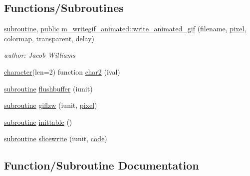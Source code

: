 \subsection*{Functions/\+Subroutines}
\begin{DoxyCompactItemize}
\item 
\hyperlink{M__stopwatch_83_8txt_acfbcff50169d691ff02d4a123ed70482}{subroutine}, \hyperlink{M__stopwatch_83_8txt_a2f74811300c361e53b430611a7d1769f}{public} \hyperlink{namespacem__writegif__animated_a3da6a5c71a9d9e1f49aa075adc6629bd}{m\+\_\+writegif\+\_\+animated\+::write\+\_\+animated\+\_\+gif} (filename, \hyperlink{shell_8f90_a5c599e945a5e0c9c8954969ea48587cf}{pixel}, colormap, transparent, delay)
\begin{DoxyCompactList}\small\item\em author\+: Jacob Williams \end{DoxyCompactList}\item 
\hyperlink{option__stopwatch_83_8txt_abd4b21fbbd175834027b5224bfe97e66}{character}(len=2) function \hyperlink{M__writegif__animated_8f90_a795066c06f318c8d4ba41430b6826567}{char2} (ival)
\item 
\hyperlink{M__stopwatch_83_8txt_acfbcff50169d691ff02d4a123ed70482}{subroutine} \hyperlink{M__writegif__animated_8f90_a83cb0569b0e010d8ad27afd1b4cd945e}{flushbuffer} (iunit)
\item 
\hyperlink{M__stopwatch_83_8txt_acfbcff50169d691ff02d4a123ed70482}{subroutine} \hyperlink{M__writegif__animated_8f90_aa30b256c6cb90f13a18e32768d35696b}{giflzw} (iunit, \hyperlink{shell_8f90_a5c599e945a5e0c9c8954969ea48587cf}{pixel})
\item 
\hyperlink{M__stopwatch_83_8txt_acfbcff50169d691ff02d4a123ed70482}{subroutine} \hyperlink{M__writegif__animated_8f90_acd7274fbac8690a12be91b542378a4eb}{inittable} ()
\item 
\hyperlink{M__stopwatch_83_8txt_acfbcff50169d691ff02d4a123ed70482}{subroutine} \hyperlink{M__writegif__animated_8f90_ac5c0245eea61f109cbf3ce5bbf38981b}{slicewrite} (iunit, \hyperlink{ufpp__overview_81_8txt_a74a0615f2d9c4a398d9126096f8092f8}{code})
\end{DoxyCompactItemize}


\subsection{Function/\+Subroutine Documentation}
\mbox{\label{M__writegif__animated_8f90_a795066c06f318c8d4ba41430b6826567}} 
